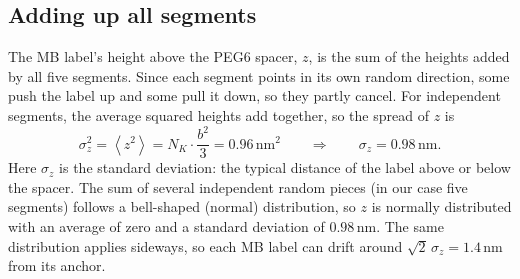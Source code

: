 \documentclass[10pt,a4paper]{article}
\numberwithin{equation}{section}
\newcommand{\nm}{\,\mathrm{nm}}
\newcommand{\avg}[1]{\left\langle #1\right\rangle}
\begin{document}
\subsection*{Adding up all segments}
The MB label's height above the PEG6 spacer, $z$, is the sum of the heights added by all five segments. Since each segment points in its own random direction, some push the label up and some pull it down, so they partly cancel. For independent segments, the average squared heights add together, so the spread of $z$ is
\[
\sigma_z^2 = \avg{z^2} = N_K\cdot\frac{b^2}{3} = 0.96\,\mathrm{nm^2} \qquad\Longrightarrow\qquad \sigma_z = 0.98\nm.
\]
Here $\sigma_z$ is the standard deviation: the typical distance of the label above or below the spacer. The sum of several independent random pieces (in our case five segments) follows a bell-shaped (normal) distribution, so $z$ is normally distributed with an average of zero and a standard deviation of $0.98\nm$. The same distribution applies sideways, so each MB label can drift around $\sqrt{2}\,\sigma_z = 1.4\nm$ from its anchor.
\end{document}
